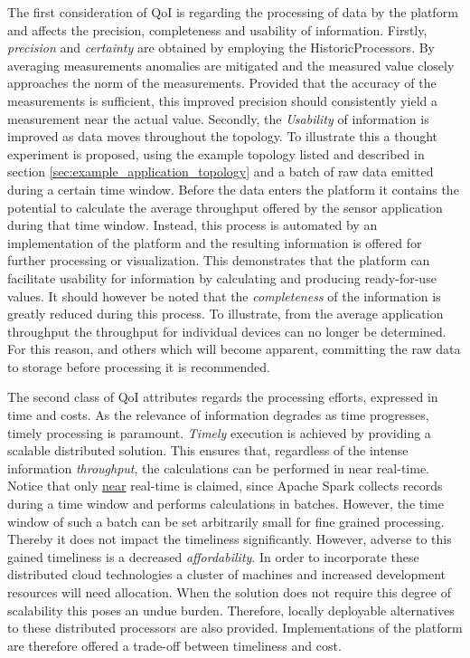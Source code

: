 The first consideration of QoI is regarding the processing of data by the platform and affects the precision, completeness and usability of information. Firstly, \emph{precision} and \emph{certainty} are obtained by employing the HistoricProcessors. By averaging measurements anomalies are mitigated and the measured value closely approaches the norm of the measurements. Provided that the accuracy of the measurements is sufficient, this improved precision should consistently yield a measurement near the actual value. Secondly, the \emph{Usability} of information is improved as data moves throughout the topology. To illustrate this a thought experiment is proposed, using the example topology listed and described in section \ref{sec:example_application_topology} and a batch of raw data emitted during a certain time window. Before the data enters the platform it contains the potential to calculate the average throughput offered by the sensor application during that time window. Instead, this process is automated by an implementation of the platform and the resulting information is offered for further processing or visualization. This demonstrates that the platform can facilitate usability for information by calculating and producing ready-for-use values. It should however be noted that the \emph{completeness} of the information is greatly reduced during this process. To illustrate, from the average application throughput the throughput for individual devices can no longer be determined. For this reason, and others which will become apparent, committing the raw data to storage before processing it is recommended.

The second class of QoI attributes regards the processing efforts, expressed in time and costs. As the relevance of information degrades as time progresses, timely processing is paramount. \emph{Timely} execution is achieved by providing a scalable distributed solution. This ensures that, regardless of the intense information \emph{throughput}, the calculations can be performed in near real-time. Notice that only \underline{near} real-time is claimed, since Apache Spark collects records during a time window and performs calculations in batches. However, the time window of such a batch can be set arbitrarily small for fine grained processing. Thereby it does not impact the timeliness significantly. However, adverse to this gained timeliness is a decreased \emph{affordability}. In order to incorporate these distributed cloud technologies a cluster of machines and increased development resources will need allocation. When the solution does not require this degree of scalability this poses an undue burden. Therefore, locally deployable alternatives to these distributed processors are also provided. Implementations of the platform are therefore offered a trade-off between timeliness and cost.
	
